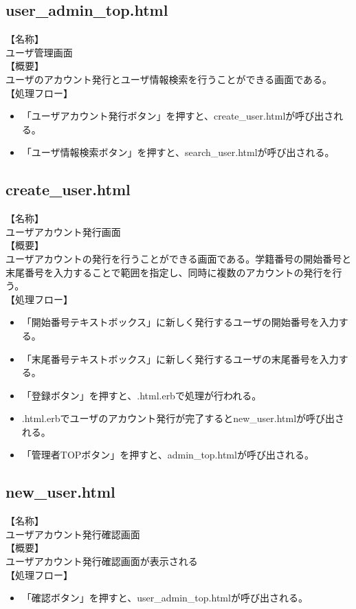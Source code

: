 \documentclass[a4j]{jarticle}
\begin{document}
\subsection{user\_admin\_top.html}
\noindent
【名称】\\
ユーザ管理画面\\
【概要】\\
ユーザのアカウント発行とユーザ情報検索を行うことができる画面である。\\
【処理フロー】
\begin{itemize}
\item 「ユーザアカウント発行ボタン」を押すと、create\_user.htmlが呼び出される。
\item 「ユーザ情報検索ボタン」を押すと、search\_user.htmlが呼び出される。
\end{itemize}

\subsection{create\_user.html}
\noindent
【名称】\\
ユーザアカウント発行画面\\
【概要】\\
ユーザアカウントの発行を行うことができる画面である。学籍番号の開始番号と末尾番号を入力することで範囲を指定し、同時に複数のアカウントの発行を行う。\\
【処理フロー】
\begin{itemize}
\item 「開始番号テキストボックス」に新しく発行するユーザの開始番号を入力する。
\item 「末尾番号テキストボックス」に新しく発行するユーザの末尾番号を入力する。
\item 「登録ボタン」を押すと、.html.erbで処理が行われる。
\item .html.erbでユーザのアカウント発行が完了するとnew\_user.htmlが呼び出される。
\item 「管理者TOPボタン」を押すと、admin\_top.htmlが呼び出される。
\end{itemize}

\subsection{new\_user.html}
\noindent
【名称】\\
ユーザアカウント発行確認画面\\
【概要】\\
ユーザアカウント発行確認画面が表示される\\
【処理フロー】
\begin{itemize}
\item 「確認ボタン」を押すと、user\_admin\_top.htmlが呼び出される。
\end{itemize}
\end{document}
